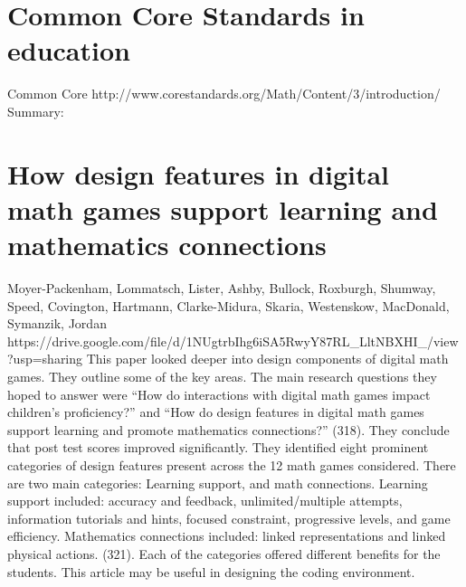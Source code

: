 \documentclass[12pt]{extarticle}
\begin{document}
\section{Common Core Standards in education}
Common Core
http://www.corestandards.org/Math/Content/3/introduction/ 
Summary:	

\section[1fjashort]{How design features in digital math games support learning and mathematics connections}
Moyer-Packenham, Lommatsch, Lister, Ashby, Bullock, Roxburgh, Shumway, Speed, Covington, Hartmann, Clarke-Midura, Skaria, Westenskow, MacDonald, Symanzik, Jordan
https://drive.google.com/file/d/1NUgtrbIhg6iSA5RwyY87RL_LltNBXHI_/view?usp=sharing  
This paper looked deeper into design components of digital math games. They outline some of the key areas. The main research questions they hoped to answer were “How do interactions with digital math games impact children’s proficiency?” and “How do design features in digital math games support learning and promote mathematics connections?” (318). They conclude that post test scores improved significantly. They identified eight prominent categories of design features present across the 12 math games considered. There are two main categories: Learning support, and math connections. Learning support included: accuracy and feedback, unlimited/multiple attempts, information tutorials and hints, focused constraint, progressive levels, and game efficiency. Mathematics connections included: linked representations and linked physical actions. (321). Each of the categories offered different benefits for the students. This article may be useful in designing the coding environment. 
\end{document}
